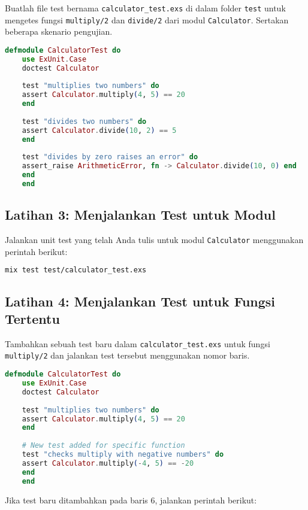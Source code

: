 Buatlah file test bernama \texttt{calculator\_test.exs} di dalam folder \texttt{test} untuk mengetes fungsi \texttt{multiply/2} dan \texttt{divide/2} dari modul \texttt{Calculator}. Sertakan beberapa skenario pengujian.

\begin{lstlisting}[language=Elixir]
	defmodule CalculatorTest do
	use ExUnit.Case
	doctest Calculator
	
	test "multiplies two numbers" do
	assert Calculator.multiply(4, 5) == 20
	end
	
	test "divides two numbers" do
	assert Calculator.divide(10, 2) == 5
	end
	
	test "divides by zero raises an error" do
	assert_raise ArithmeticError, fn -> Calculator.divide(10, 0) end
	end
	end
\end{lstlisting}

\subsection{Latihan 3: Menjalankan Test untuk Modul}

Jalankan unit test yang telah Anda tulis untuk modul \texttt{Calculator} menggunakan perintah berikut:

\begin{lstlisting}[language=Bash]
	mix test test/calculator_test.exs
\end{lstlisting}

\subsection{Latihan 4: Menjalankan Test untuk Fungsi Tertentu}

Tambahkan sebuah test baru dalam \texttt{calculator\_test.exs} untuk fungsi \texttt{multiply/2} dan jalankan test tersebut menggunakan nomor baris.

\begin{lstlisting}[language=Elixir]
	defmodule CalculatorTest do
	use ExUnit.Case
	doctest Calculator
	
	test "multiplies two numbers" do
	assert Calculator.multiply(4, 5) == 20
	end
	
	# New test added for specific function
	test "checks multiply with negative numbers" do
	assert Calculator.multiply(-4, 5) == -20
	end
	end
\end{lstlisting}

Jika test baru ditambahkan pada baris 6, jalankan perintah berikut:

